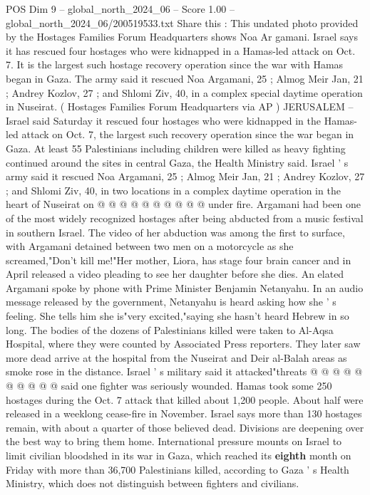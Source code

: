 \begin{textsample}{POS Dim 9 – global\_north\_2024\_06 – Score 1.00 – global\_north\_2024\_06/200519533.txt}  \label{ex:f9_pos_281}
Share this : This undated photo provided by the Hostages Families Forum Headquarters shows Noa Ar gamani.
Israel says it has rescued four hostages who were kidnapped in a Hamas-led attack on Oct. 7.
It is the largest such hostage recovery operation since the war with Hamas began in Gaza.
The army said it rescued Noa Argamani, 25 ; Almog Meir Jan, 21 ; Andrey Kozlov, 27 ; and Shlomi Ziv, 40, in a complex special daytime operation in Nuseirat. ( Hostages Families Forum Headquarters via AP ) JERUSALEM -- Israel said Saturday it rescued four hostages who were kidnapped in the Hamas-led attack on Oct. 7, the largest such recovery operation since the war began in Gaza.
At least 55 Palestinians including children were killed as heavy fighting continued around the sites in central Gaza, the Health Ministry said.
Israel ' s army said it rescued Noa Argamani, 25 ; Almog Meir Jan, 21 ; Andrey Kozlov, 27 ; and Shlomi Ziv, 40, in two locations in a complex daytime operation in the heart of Nuseirat on @ @ @ @ @ @ @ @ @ @ under fire.
Argamani had been one of the most widely recognized hostages after being abducted from a music festival in southern Israel.
The video of her abduction was among the first to surface, with Argamani detained between two men on a motorcycle as she screamed,"Don't kill me!"Her mother, Liora, has stage four brain cancer and in April released a video pleading to see her daughter before she dies.
An elated Argamani spoke by phone with Prime Minister Benjamin Netanyahu.
In an audio message released by the government, Netanyahu is heard asking how she ' s feeling.
She tells him she is"very excited,"saying she hasn't heard Hebrew in so long.
The bodies of the dozens of Palestinians killed were taken to Al-Aqsa Hospital, where they were counted by Associated Press reporters.
They later saw more dead arrive at the hospital from the Nuseirat and Deir al-Balah areas as smoke rose in the distance.
Israel ' s military said it attacked"threats @ @ @ @ @ @ @ @ @ @ said one fighter was seriously wounded.
Hamas took some 250 hostages during the Oct. 7 attack that killed about 1,200 people.
About half were released in a weeklong cease-fire in November.
Israel says more than 130 hostages remain, with about a quarter of those believed dead.
Divisions are deepening over the best way to bring them home.
International pressure mounts on Israel to limit civilian bloodshed in its war in Gaza, which reached its \textbf{eighth} month on Friday with more than 36,700 Palestinians killed, according to Gaza ' s Health Ministry, which does not distinguish between fighters and civilians.

\end{textsample}
